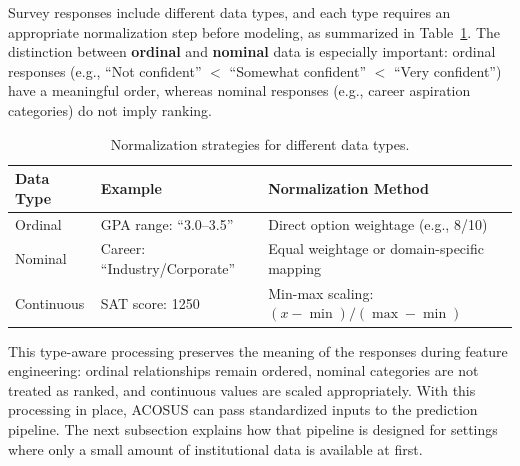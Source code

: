 \documentclass[letterpaper,11pt]{article}
\begin{document}
Survey responses include different data types, and each type requires an appropriate normalization step before modeling, as summarized in Table~\ref{tab:normalization}. The distinction between \textbf{ordinal} and \textbf{nominal} data is especially important: ordinal responses (e.g., ``Not confident'' $<$ ``Somewhat confident'' $<$ ``Very confident'') have a meaningful order, whereas nominal responses (e.g., career aspiration categories) do not imply ranking.

\begin{table}[htbp]
\caption{Normalization strategies for different data types.}
\label{tab:normalization}
\centering
\begin{tabular}{@{}lll@{}}
\toprule
\textbf{Data Type} & \textbf{Example} & \textbf{Normalization Method} \\
\midrule
Ordinal & GPA range: ``3.0--3.5'' & Direct option weightage (e.g., 8/10) \\
Nominal & Career: ``Industry/Corporate'' & Equal weightage or domain-specific mapping \\
Continuous & SAT score: 1250 & Min-max scaling: $(x - \min)/(\max - \min)$ \\
\bottomrule
\end{tabular}
\end{table}

This type-aware processing preserves the meaning of the responses during feature engineering: ordinal relationships remain ordered, nominal categories are not treated as ranked, and continuous values are scaled appropriately. With this processing in place, ACOSUS can pass standardized inputs to the prediction pipeline. The next subsection explains how that pipeline is designed for settings where only a small amount of institutional data is available at first.
\end{document}
